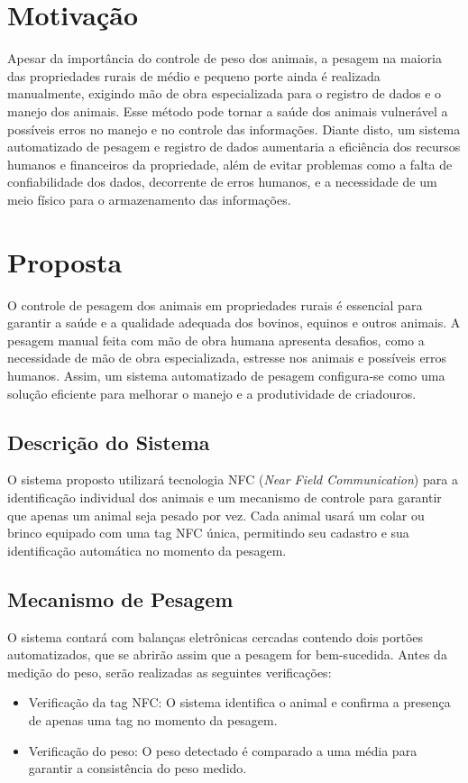 \documentclass[11pt]{article}
\begin{document}
\section{Motivação}
Apesar da importância do controle de peso dos animais, a pesagem na maioria das propriedades rurais de médio e pequeno porte ainda é realizada manualmente, exigindo mão de obra especializada para o registro de dados e o manejo dos animais. Esse método pode tornar a saúde dos animais vulnerável a possíveis erros no manejo e no controle das informações. Diante disto, um sistema automatizado de pesagem e registro de dados aumentaria a eficiência dos recursos humanos e financeiros da propriedade, além de evitar problemas como a falta de confiabilidade dos dados, decorrente de erros humanos, e a necessidade de um meio físico para o armazenamento das informações.

\section{Proposta}
O controle de pesagem dos animais em propriedades rurais é essencial para garantir a saúde e a qualidade adequada dos bovinos, equinos e outros animais. A pesagem manual feita com mão de obra humana apresenta desafios, como a necessidade de mão de obra especializada, estresse nos animais e possíveis erros humanos. Assim, um sistema automatizado de pesagem configura-se como uma solução eficiente para melhorar o manejo e a produtividade de criadouros.

\subsection{Descrição do Sistema}
O sistema proposto utilizará tecnologia NFC (\textit{Near Field Communication}) para a identificação individual dos animais e um mecanismo de controle para garantir que apenas um animal seja pesado por vez. Cada animal usará um colar ou brinco equipado com uma tag NFC única, permitindo seu cadastro e sua identificação automática no momento da pesagem.

\subsection{Mecanismo de Pesagem}
O sistema contará com balanças eletrônicas cercadas contendo dois portões automatizados, que se abrirão assim que a pesagem for bem-sucedida. Antes da medição do peso, serão realizadas as seguintes verificações:

\begin{itemize}
    \item Verificação da tag NFC: O sistema identifica o animal e confirma a presença de apenas uma tag no momento da pesagem.
    \item Verificação do peso: O peso detectado é comparado a uma média para garantir a consistência do peso medido.
\end{itemize}
\end{document}
